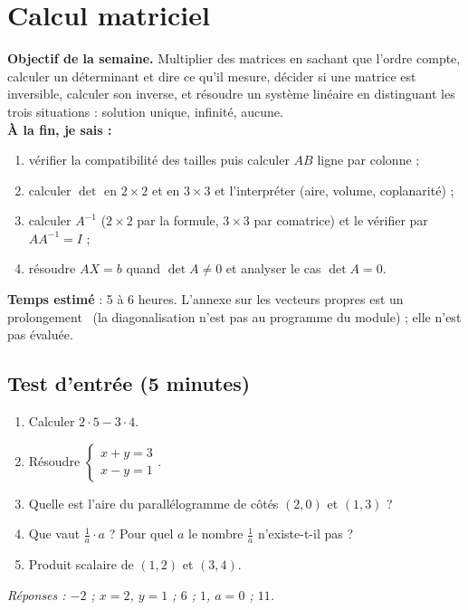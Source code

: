 \clearpage
\section{Calcul matriciel}
\renewcommand{\titrecourant}{Semaine 6}

\begin{boussole}
\textbf{Objectif de la semaine.} Multiplier des matrices en sachant que l'ordre compte, calculer un déterminant et dire ce qu'il mesure, décider si une matrice est inversible, calculer son inverse, et résoudre un système linéaire en distinguant les trois situations : solution unique, infinité, aucune.\\
\textbf{À la fin, je sais :}
\begin{enumerate}
 \item vérifier la compatibilité des tailles puis calculer $AB$ ligne par colonne ;
 \item calculer $\det$ en $2\times2$ et en $3\times3$ et l'interpréter (aire, volume, coplanarité) ;
 \item calculer $A^{-1}$ ($2\times2$ par la formule, $3\times3$ par comatrice) et le vérifier par $AA^{-1}=I$ ;
 \item résoudre $AX=b$ quand $\det A\ne0$ et analyser le cas $\det A=0$.
\end{enumerate}
\textbf{Temps estimé} : 5 à 6 heures. L'annexe sur les vecteurs propres est un prolongement \horsprog\ (la diagonalisation n'est pas au programme du module) ; elle n'est pas évaluée.
\end{boussole}

\subsection{Test d'entrée (5 minutes)}
\begin{enumerate}
 \item Calculer $2\cdot5-3\cdot4$.
 \item Résoudre $\begin{cases}x+y=3\\x-y=1\end{cases}$.
 \item Quelle est l'aire du parallélogramme de côtés $(2,0)$ et $(1,3)$ ?
 \item Que vaut $\frac1a\cdot a$ ? Pour quel $a$ le nombre $\frac1a$ n'existe-t-il pas ?
 \item Produit scalaire de $(1,2)$ et $(3,4)$.
\end{enumerate}
\textit{Réponses : $-2$ ; $x=2$, $y=1$ ; $6$ ; $1$, $a=0$ ; $11$.}

